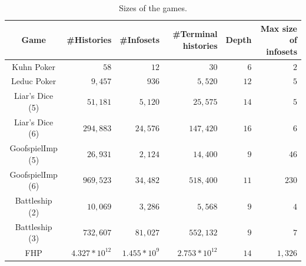 \documentclass[letterpaper]{article} %
\begin{document}
\begin{table}[h]
	\centering
	\begin{tabular}{c|rrrrr}
			\toprule 
            \textbf{Game}                &  \textbf{\#Histories}   & \textbf{\#Infosets} & \textbf{\#Terminal histories} & \textbf{Depth}        & \textbf{Max size of infosets} \\ \midrule
            Kuhn Poker          &  $58$           & $12$           & $30$           & $6$            & $2$            \\ 
            Leduc Poker         &  $9,457$         & $936$          & $5,520$         & $12$           & $5$            \\ 
            Liar's Dice (5)     &  $51,181$        & $5,120$         & $25,575$        & $14$           & $5$            \\ 
            Liar's Dice (6)     &  $294,883$       & $24,576$        & $147,420$        & $16$           & $6$            \\ 
            GoofspielImp (5)    &  $26,931$        & $2,124$         & $14,400$        & $9$            & $46$           \\
            GoofspielImp (6)    &  $969,523$       & $34,482$        & $518,400$        & $11$            & $230$           \\ 
            Battleship (2)      &  $10,069$        & $3,286$         & $5,568$         & $9$            & $4$            \\ 
            Battleship (3)      &  $732,607$       & $81,027$        & $552,132$       & $9$            & $7$            \\       FHP      & $4.327*10^{12}$     &  $1.455*10^{9}$       &  $2.753*10^{12}$   &  $14$          &  $1,326$  \\ 
			\bottomrule
        \end{tabular}
    \caption{Sizes of the games.}
    \label{tab:game}
\end{table}
\end{document}
